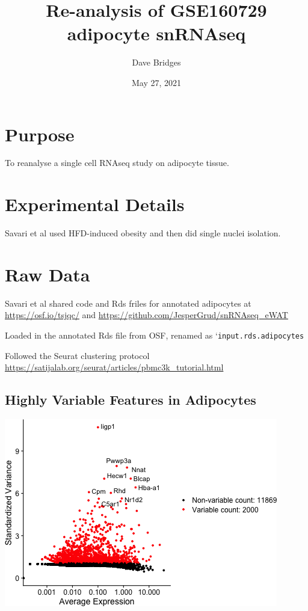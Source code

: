 \documentclass[]{article}
\title{Re-analysis of GSE160729 adipocyte snRNAseq}
\author{Dave Bridges}
\date{May 27, 2021}
\begin{document}
\maketitle

{
\setcounter{tocdepth}{2}
\tableofcontents
}
\hypertarget{purpose}{%
\section{Purpose}\label{purpose}}

To reanalyse a single cell RNAseq study on adipocyte tissue.

\hypertarget{experimental-details}{%
\section{Experimental Details}\label{experimental-details}}

Savari et al used HFD-induced obesity and then did single nuclei
isolation.

\hypertarget{raw-data}{%
\section{Raw Data}\label{raw-data}}

Savari et al shared code and Rds friles for annotated adipocytes at
\url{https://osf.io/tsjqc/} and
\url{https://github.com/JesperGrud/snRNAseq_eWAT}

Loaded in the annotated Rds file from OSF, renamed as
`\texttt{input.rds.adipocytes}

Followed the Seurat clustering protocol
\url{https://satijalab.org/seurat/articles/pbmc3k_tutorial.html}

\hypertarget{highly-variable-features-in-adipocytes}{%
\subsection{Highly Variable Features in
Adipocytes}\label{highly-variable-features-in-adipocytes}}

\includegraphics{figures/GSE160729-variable-features-1.png}
\end{document}
